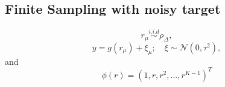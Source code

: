 \documentclass[11pt,a4paper]{article}
\theoremstyle{remark}
\begin{document}
\begin{onehalfspace}
\section{Finite Sampling with noisy target}
$$r_\mu \overset{i.i.d}{\sim} \rho_\Delta, $$
$$ y = g(r_\mu) + \xi_\mu; \hspace{1em} \xi \sim \mathcal{N}(0,\tau^2),$$
and
$$\phi(r) = (1, r, r^2,..., r^{K-1})^T$$
\end{onehalfspace}
\end{document}

